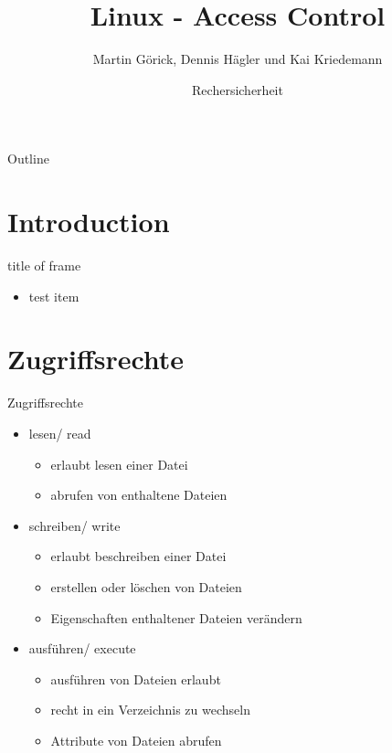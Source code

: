 \documentclass[ucs,9pt]{beamer}
\title[Linux - Access Control] %
{Linux - Access Control}
\subtitle
{}
\author[Author, Another] %
{Martin Görick, Dennis Hägler und Kai Kriedemann}
\institute[FU Berlin] %
{Freie Universität Berlin}
\date[] %
{Rechersicherheit}
\begin{document}
\begin{frame}[plain]
  \titlepage
\end{frame}

\begin{frame}{Outline}
  \tableofcontents[hideothersubsections]
\end{frame}

\section{Introduction}

\begin{frame}{title of frame} %
\begin{itemize}
\item test item
\end{itemize}
\end{frame}

\section{Zugriffsrechte}

\begin{frame}{Zugriffsrechte}
\begin{itemize}
	\item lesen/ read
		\begin{itemize}
			\item erlaubt lesen einer Datei
			\item abrufen von enthaltene Dateien
		\end{itemize}
	\item schreiben/ write
		\begin{itemize}
			\item erlaubt beschreiben einer Datei
			\item erstellen oder löschen von Dateien
			\item Eigenschaften enthaltener Dateien verändern 
		\end{itemize}
	\item ausführen/ execute
		\begin{itemize}
			\item ausführen von Dateien erlaubt
			\item recht in ein Verzeichnis zu wechseln
			\item Attribute von Dateien abrufen
		\end{itemize}
\end{itemize}
\end{frame}
\end{document}
